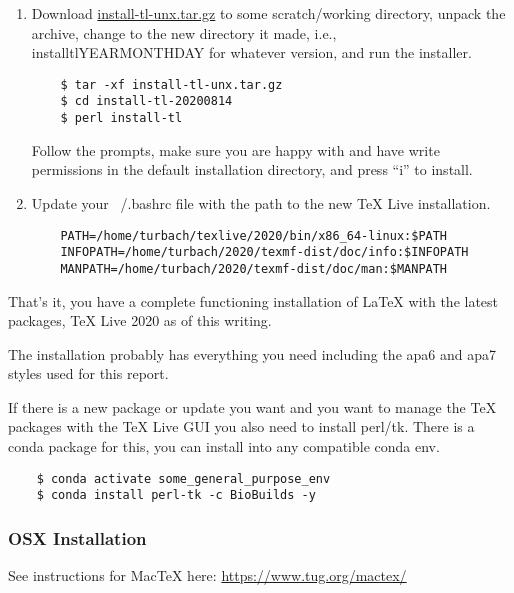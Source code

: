 \documentclass[letter,doc,natbib,11pt]{apa7}  %
\begin{document}
\begin{enumerate}

\item Download \url{install-tl-unx.tar.gz} to some scratch/working
  directory, unpack the archive, change to the new directory it
  made, i.e., \mbox{install\textendash tl\textendash YEARMONTHDAY} for
  whatever version, and run the installer.

  \begin{verbatim}
    $ tar -xf install-tl-unx.tar.gz 
    $ cd install-tl-20200814
    $ perl install-tl
  \end{verbatim}

  Follow the prompts, make sure you are happy with and have write
  permissions in the default installation directory, and press ``i''
  to install.

\item Update your ~/.bashrc file with the path to the new TeX Live
  installation.

  \begin{verbatim}
    PATH=/home/turbach/texlive/2020/bin/x86_64-linux:$PATH
    INFOPATH=/home/turbach/2020/texmf-dist/doc/info:$INFOPATH
    MANPATH=/home/turbach/2020/texmf-dist/doc/man:$MANPATH
  \end{verbatim}

\end{enumerate}

That's it, you have a complete functioning installation of \LaTeX{}
with the latest packages, TeX Live 2020 as of this writing.

The installation probably has everything you need including the apa6
and apa7 styles used for this report.

If there is a new package or update you want and you want to manage
the TeX packages with the TeX Live GUI you also need to install
perl/tk. There is a conda package for this, you can install into any
compatible conda env.

  \begin{verbatim}
    $ conda activate some_general_purpose_env
    $ conda install perl-tk -c BioBuilds -y
  \end{verbatim}


\subsubsection{OSX Installation}

See instructions for MacTeX here: \url{https://www.tug.org/mactex/}
\end{document}
